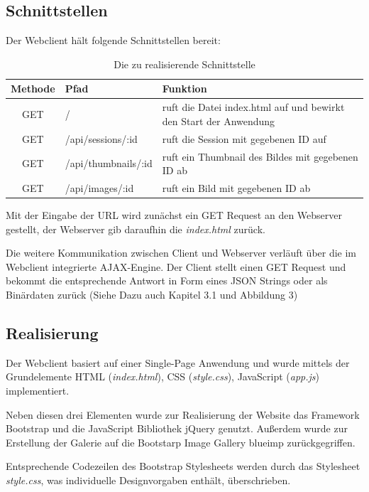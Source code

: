 \subsection{Schnittstellen}
Der Webclient hält folgende Schnittstellen bereit:

\begin{table}[h]
	\begin{center}
		\begin{tabularx}{\textwidth}{|c|l|X|}
			\hline
			\textbf{Methode} & \textbf{Pfad} & \textbf{Funktion}\\
			\hline
			GET & / & ruft die Datei index.html auf und bewirkt den Start der Anwendung \\
			\hline
			GET & /api/sessions/:id & ruft die Session mit gegebenen ID auf \\
			\hline
			GET & /api/thumbnails/:id & ruft ein Thumbnail des Bildes mit gegebenen ID ab \\
			\hline
			GET & /api/images/:id & ruft ein Bild mit gegebenen ID ab \\
			\hline
		\end{tabularx}
		\caption{Die zu realisierende Schnittstelle}
		\label{tab_api_routes}
	\end{center}
\end{table}

Mit der Eingabe der URL wird zunächst ein GET Request an den Webserver gestellt, der Webserver gib daraufhin die \textit{index.html} zurück.

Die weitere Kommunikation zwischen Client und Webserver verläuft über die im Webclient integrierte AJAX-Engine. Der Client stellt einen GET Request und bekommt die entsprechende Antwort in Form eines JSON Strings oder als Binärdaten zurück (Siehe Dazu auch Kapitel 3.1 und Abbildung 3)

\subsection{Realisierung}
Der Webclient basiert auf einer Single-Page Anwendung und wurde mittels der Grundelemente HTML (\textit{index.html}), CSS (\textit{style.css}), JavaScript (\textit{app.js}) implementiert. 

Neben diesen drei Elementen wurde zur Realisierung der Website das Framework Bootstrap und die JavaScript Bibliothek jQuery genutzt. Außerdem wurde zur Erstellung der Galerie auf die Bootstarp Image Gallery blueimp  zurückgegriffen.

Entsprechende Codezeilen des Bootstrap Stylesheets werden durch das Stylesheet \textit{style.css}, was individuelle Designvorgaben enthält, überschrieben. 

